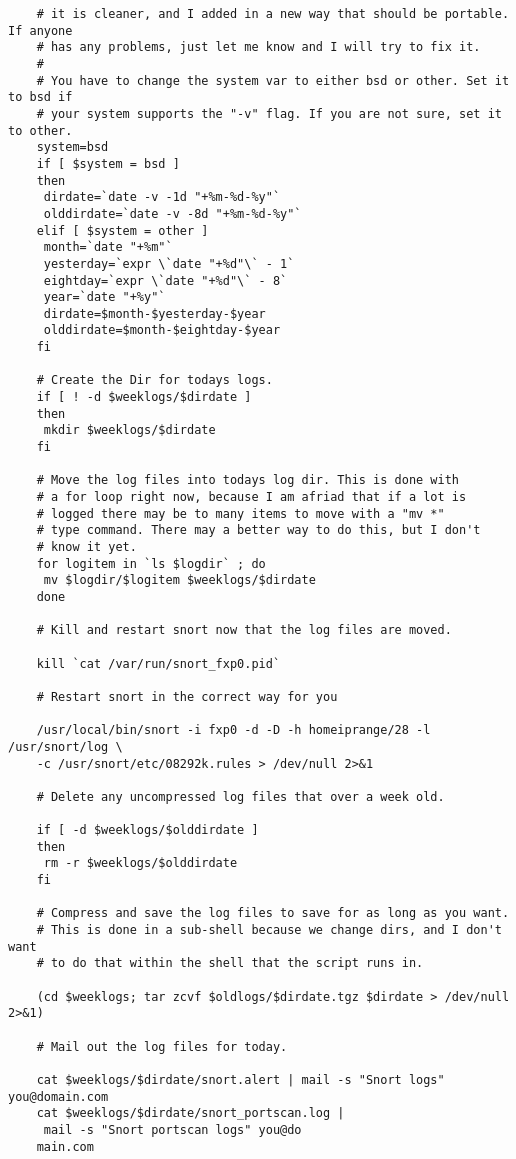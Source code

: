 \documentclass{article}
\begin{document}
\begin{verbatim}
    # it is cleaner, and I added in a new way that should be portable. If anyone
    # has any problems, just let me know and I will try to fix it.
    #
    # You have to change the system var to either bsd or other. Set it to bsd if
    # your system supports the "-v" flag. If you are not sure, set it to other.
    system=bsd
    if [ $system = bsd ]
    then
     dirdate=`date -v -1d "+%m-%d-%y"`
     olddirdate=`date -v -8d "+%m-%d-%y"`
    elif [ $system = other ]
     month=`date "+%m"`
     yesterday=`expr \`date "+%d"\` - 1`
     eightday=`expr \`date "+%d"\` - 8`
     year=`date "+%y"`
     dirdate=$month-$yesterday-$year
     olddirdate=$month-$eightday-$year
    fi
    
    # Create the Dir for todays logs.
    if [ ! -d $weeklogs/$dirdate ]
    then
     mkdir $weeklogs/$dirdate
    fi
    
    # Move the log files into todays log dir. This is done with
    # a for loop right now, because I am afriad that if a lot is
    # logged there may be to many items to move with a "mv *"
    # type command. There may a better way to do this, but I don't
    # know it yet.
    for logitem in `ls $logdir` ; do
     mv $logdir/$logitem $weeklogs/$dirdate
    done
    
    # Kill and restart snort now that the log files are moved.
 
    kill `cat /var/run/snort_fxp0.pid`
    
    # Restart snort in the correct way for you
 
    /usr/local/bin/snort -i fxp0 -d -D -h homeiprange/28 -l /usr/snort/log \
    -c /usr/snort/etc/08292k.rules > /dev/null 2>&1

    # Delete any uncompressed log files that over a week old.
 
    if [ -d $weeklogs/$olddirdate ]
    then
     rm -r $weeklogs/$olddirdate
    fi

    # Compress and save the log files to save for as long as you want.
    # This is done in a sub-shell because we change dirs, and I don't want 
    # to do that within the shell that the script runs in.

    (cd $weeklogs; tar zcvf $oldlogs/$dirdate.tgz $dirdate > /dev/null 2>&1)

    # Mail out the log files for today.

    cat $weeklogs/$dirdate/snort.alert | mail -s "Snort logs" you@domain.com
    cat $weeklogs/$dirdate/snort_portscan.log |
     mail -s "Snort portscan logs" you@do
    main.com
    \end{verbatim}
\end{document}

